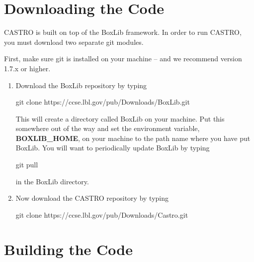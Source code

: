 
\section{Downloading the Code}

CASTRO is built on top of the BoxLib framework.  In order to run CASTRO, you must download
two separate git modules.

\vspace{.1in}

\noindent First, make sure git is installed on your machine -- and we recommend version 1.7.x or higher.

\vspace{.1in}

\begin{enumerate}

\item Download the BoxLib repository by typing 

\noindent git clone https://ccse.lbl.gov/pub/Downloads/BoxLib.git 

\noindent This will create a directory called BoxLib on your machine.  Put this somewhere out of the way and 
set the environment variable, {\bf BOXLIB\_HOME}, on your machine to the path name where
you have put BoxLib.    You will want to periodically update BoxLib by typing 

\noindent git pull

in the BoxLib directory.  

\item Now download the CASTRO repository by typing 

\noindent git clone https://ccse.lbl.gov/pub/Downloads/Castro.git 

\end{enumerate}


\section{Building the Code}

